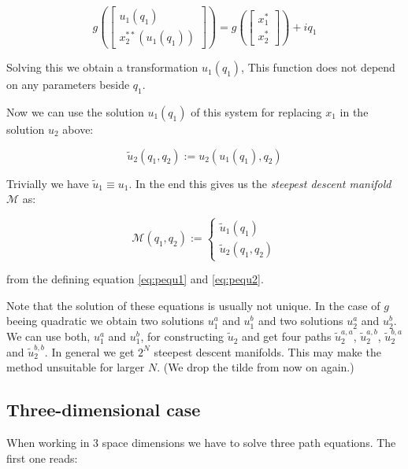 \documentclass[a4paper,10pt]{article}
\begin{document}
\begin{equation} \label{eq:pequ1}
 g\left(
 \begin{bmatrix}
  u_1(q_1) \\
  x_2^{**}\left( u_1(q_1) \right)
 \end{bmatrix}
 \right)
 =
 g\left(
 \begin{bmatrix}
  x_1^{*} \\ x_2^{*}
 \end{bmatrix}
 \right)
 + i q_1
\end{equation}

Solving this we obtain a transformation $u_1(q_1)$, This function
does not depend on any parameters beside $q_1$.

Now we can use the solution $u_1(q_1)$ of this system for replacing
$x_1$ in the solution $u_2$ above:

\begin{equation}
 \tilde{u}_2\left(q_1, q_2\right) := u_2\left( u_1\left(q_1\right), q_2 \right)
\end{equation}

Trivially we have $\tilde{u}_1 \equiv u_1$. In the end this gives us the
\emph{steepest descent manifold} $\mathcal{M}$ as:

\begin{equation}
\mathcal{M}(q_1, q_2) :=
 \begin{cases}
  \tilde{u}_1(q_1) \\
  \tilde{u}_2(q_1, q_2)
 \end{cases}
\end{equation}

from the defining equation \eqref{eq:pequ1} and \eqref{eq:pequ2}.

Note that the solution of these equations is usually not unique. In the case of $g$ beeing
quadratic we obtain two solutions $u_1^a$ and $u_1^b$ and two solutions $u_2^a$ and $u_2^b$.
We can use both, $u_1^a$ and $u_1^b$, for constructing $\tilde{u}_2$ and get four paths
$\tilde{u}_2^{a,a}$, $\tilde{u}_2^{a,b}$, $\tilde{u}_2^{b,a}$ and $\tilde{u}_2^{b,b}$.
In general we get $2^N$ steepest descent manifolds. This may make the method unsuitable
for larger $N$. (We drop the tilde from now on again.)


\subsection{Three-dimensional case}

When working in 3 space dimensions we have to solve three path equations.
The first one reads:
\end{document}
